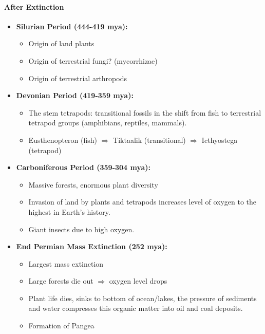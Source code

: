 \documentclass[12pt]{article}
\begin{document}
\paragraph{After Extinction}
\begin{itemize}
    \item \textbf{Silurian Period (444-419 mya):}
          \begin{itemize}
              \item Origin of land plants
              \item Origin of terrestrial fungi? (mycorrhizae)
              \item Origin of terrestrial arthropods
          \end{itemize}
    \item \textbf{Devonian Period (419-359 mya):}
          \begin{itemize}
              \item The stem tetrapods: transitional fossils in the shift from fish to terrestrial tetrapod groups (amphibians, reptiles, mammals).
              \item Eusthenopteron (fish) $\Rightarrow$ Tiktaalik (transitional) $\Rightarrow$ Icthyostega (tetrapod)
          \end{itemize}
    \item \textbf{Carboniferous Period (359-304 mya):}
          \begin{itemize}
              \item Massive forests, enormous plant diversity
              \item Invasion of land by plants and tetrapods increases level of oxygen to the highest in Earth's history.
              \item Giant insects due to high oxygen.
          \end{itemize}
    \item \textbf{End Permian Mass Extinction (252 mya):}
          \begin{itemize}
              \item Largest mass extinction
              \item Large forests die out $\Rightarrow$ oxygen level drops
              \item Plant life dies, sinks to bottom of ocean/lakes, the pressure of sediments and water compresses this organic matter into oil and coal deposits.
              \item Formation of Pangea
          \end{itemize}
\end{itemize}
\end{document}

